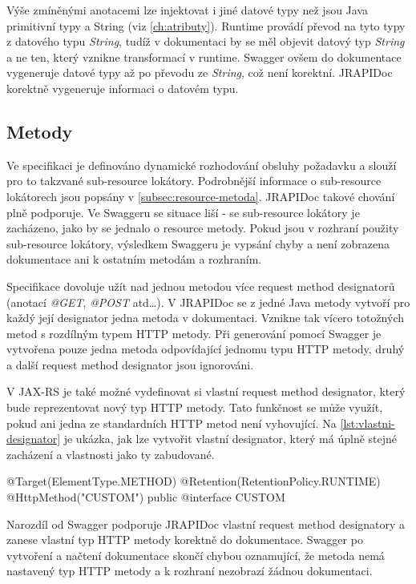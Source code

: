 \documentclass[11pt,twoside,a4paper]{book}
\begin{document}
Výše zmíněnými anotacemi lze injektovat i jiné datové typy než jsou Java
primitivní typy a String (viz \ref{ch:atributy}). Runtime provádí převod na tyto
typy z datového typu {\em String}, tudíž v dokumentaci by se měl objevit datový
typ {\em String} a ne ten, který vznikne transformací v runtime.
Swagger ovšem do dokumentace vygeneruje datové typy až po převodu ze {\em
String}, což není korektní. JRAPIDoc korektně vygeneruje informaci o datovém
typu.

\subsection{Metody}

Ve specifikaci je definováno dynamické rozhodování obsluhy požadavku a slouží
pro to takzvané sub-resource lokátory. Podrobnější informace o sub-resource
lokátorech jsou popsány v \ref{subsec:resource-metoda}. JRAPIDoc takové chování
plně podporuje. Ve Swaggeru se situace liší - se sub-resource lokátory  je
zacházeno, jako by se jednalo o resource metody. Pokud jsou v rozhraní
použity sub-resource lokátory, výsledkem Swaggeru je vypsání chyby a není 
zobrazena dokumentace ani k ostatním metodám a rozhraním.

Specifikace dovoluje užít nad jednou metodou více request method designatorů
(anotací {\em @GET}, {\em @POST} atd\ldots). V JRAPIDoc se z jedné Java metody
vytvoří pro každý její designator jedna metoda v dokumentaci. Vznikne tak vícero
totožných metod s rozdílným typem HTTP metody. Při generování pomocí Swagger je
vytvořena pouze jedna metoda odpovídající jednomu typu HTTP metody, druhý a
další request method designator jsou ignorováni.

V JAX-RS je také možné vydefinovat si vlastní request method designator, který
bude reprezentovat nový typ HTTP metody. Tato funkčnost se může využít, pokud
ani jedna ze standardních HTTP metod není vyhovující. Na
\ref{lst:vlastni-designator} je ukázka, jak lze vytvořit vlastní designator,
který má úplně stejné zacházení a vlastnosti jako ty zabudované.

\begin{code}[frame=single, caption={Vlastní request method
designator},label={lst:vlastni-designator}] 
@Target({ElementType.METHOD})
@Retention(RetentionPolicy.RUNTIME)
@HttpMethod("CUSTOM")
public @interface CUSTOM {
}
\end{code}

Narozdíl od Swagger podporuje JRAPIDoc vlastní request method designatory a
zanese vlastní typ HTTP metody korektně do dokumentace. Swagger po vytvoření a
načtení dokumentace skončí chybou oznamující, že metoda nemá nastavený typ HTTP
metody a k rozhraní nezobrazí žádnou dokumentaci.
\end{document}
